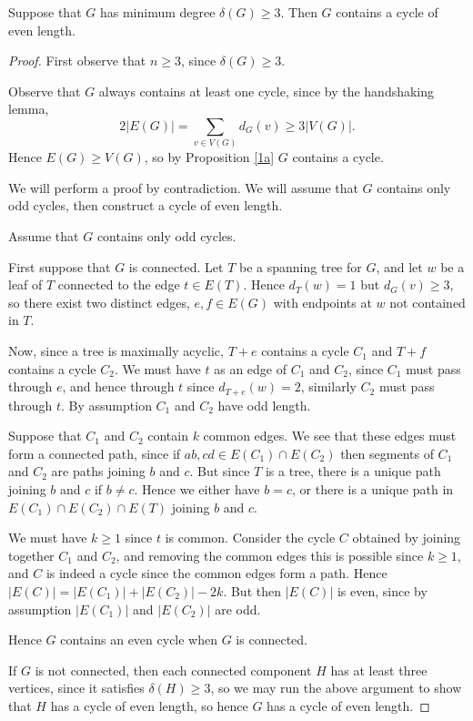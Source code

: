 \documentclass{unswmaths}
\begin{document}
\begin{proposition}[Part (c)]
    Suppose that $G$ has minimum degree $\delta(G) \geq 3$. Then $G$ contains
    a cycle of even length.
\end{proposition}
\begin{proof}
    First observe that $n \geq 3$,
    since $\delta(G) \geq 3$.

    Observe that $G$ always contains at least one cycle, since
    by the handshaking lemma,
    \begin{equation}
        2|E(G)| = \sum_{v \in V(G)} d_G(v) \geq 3|V(G)|.
    \end{equation}
    Hence $E(G) \geq V(G)$, so by Proposition \ref{1a} $G$ contains a cycle.
    
    We will perform a proof by contradiction. We will assume that $G$ contains only
    odd cycles, then construct a cycle of even length.
    
    Assume that $G$ contains only odd cycles.
    
    First suppose that $G$ is connected. Let $T$ be a spanning tree for $G$,
    and let $w$ be a leaf of $T$ connected to the edge $t \in E(T)$. Hence $d_T(w) = 1$ but $d_G(v) \geq 3$,
    so there exist two distinct edges, $e,f \in E(G)$ with endpoints at $w$
    not contained in $T$.
    
    Now, since a tree is maximally acyclic, $T+e$ contains a cycle $C_1$
    and $T+f$ contains a cycle $C_2$. We must have $t$ as an edge of $C_1$
    and $C_2$, since $C_1$ must pass through $e$, and hence through $t$
    since $d_{T+e}(w) = 2$,
    similarly $C_2$ must pass through $t$. By assumption $C_1$
    and $C_2$ have odd length.
    
    Suppose that $C_1$ and $C_2$ contain $k$ common edges. 
    We see that these edges must form a connected path, since if
    $ab,cd \in E(C_1)\cap E(C_2)$ then segments of $C_1$ and $C_2$
    are paths joining $b$ and $c$. But since $T$ is a tree, there is a unique
    path joining $b$ and $c$ if $b\neq c$. Hence we either have $b = c$, or
    there is a unique path in $E(C_1)\cap E(C_2) \cap E(T)$ joining $b$ and $c$.
    
    We must have $k \geq 1$ since $t$ is common.
    Consider the cycle $C$ obtained by joining together $C_1$ and $C_2$, and
    removing the common edges this is possible since $k \geq 1$,
    and $C$ is indeed a cycle since the common edges form a path. Hence $|E(C)| = |E(C_1)|+|E(C_2)|-2k$.
    But then $|E(C)|$ is even, since by assumption $|E(C_1)|$ and $|E(C_2)|$
    are odd.
    
    Hence $G$ contains an even cycle when $G$ is connected.
    
    If $G$ is not connected, then each connected component $H$
    has at least three vertices, since it 
    satisfies $\delta(H) \geq 3$, so we may run the above argument
    to show that $H$ has a cycle of even length, so hence $G$
    has a cycle of even length.
   
\end{proof}
\end{document}
